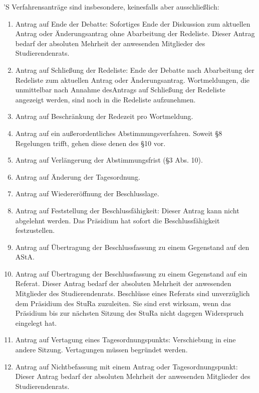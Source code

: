 \documentclass[fontsize=12pt,parskip=half, ref=short]{scrartcl}
\begin{document}
\begin{contract}
  'S Verfahrensanträge sind insbesondere, keinesfalls aber ausschließlich:
  \begin{enumerate}
  \item Antrag auf Ende der Debatte: Sofortiges Ende der Diskussion zum
    aktuellen Antrag oder Änderungsantrag ohne Abarbeitung der Redeliste. Dieser
    Antrag bedarf der absoluten Mehrheit der anwesenden Mitglieder des
    Studierendenrats.
  \item Antrag auf Schließung der Redeliste: Ende der Debatte nach Abarbeitung
    der Redeliste zum aktuellen Antrag oder Änderungsantrag. Wortmeldungen, die
    unmittelbar nach Annahme desAntrags auf Schließung der Redeliste angezeigt
    werden, sind noch in die Redeliste aufzunehmen.
  \item Antrag auf Beschränkung der Redezeit pro Wortmeldung.
  \item Antrag auf ein außerordentliches Abstimmungsverfahren. Soweit §8
    Regelungen trifft,  gehen diese denen des §10 vor.
  \item Antrag auf Verlängerung der Abstimmungsfrist (§3 Abs. 10).
  \item Antrag auf Änderung der Tagesordnung.
  \item Antrag auf Wiedereröffnung der Beschlusslage.
  \item Antrag auf Feststellung der Beschlussfähigkeit: Dieser Antrag kann nicht
    abgelehnt werden. Das Präsidium hat sofort die Beschlussfähigkeit
    festzustellen.
  \item Antrag auf Übertragung der Beschlussfassung zu einem Gegenstand auf den
    AStA.
  \item Antrag auf Übertragung der Beschlussfassung zu einem Gegenstand auf ein
    Referat. Dieser Antrag bedarf der absoluten Mehrheit der anwesenden
    Mitglieder des Studierendenrats. Beschlüsse eines Referats sind unverzüglich
    dem Präsidium des StuRa zuzuleiten. Sie sind erst wirksam, wenn das
    Präsidium bis zur nächsten Sitzung des StuRa nicht dagegen Widerspruch
    eingelegt hat.
  \item Antrag auf Vertagung eines Tagesordnungspunkts: Verschiebung in eine
    andere Sitzung. Vertagungen müssen begründet werden.
  \item Antrag auf Nichtbefassung mit einem Antrag oder Tagesordnungspunkt:
    Dieser Antrag bedarf der absoluten Mehrheit der anwesenden Mitglieder des
    Studierendenrats.
  \end{enumerate}

\end{contract}
\end{document}
